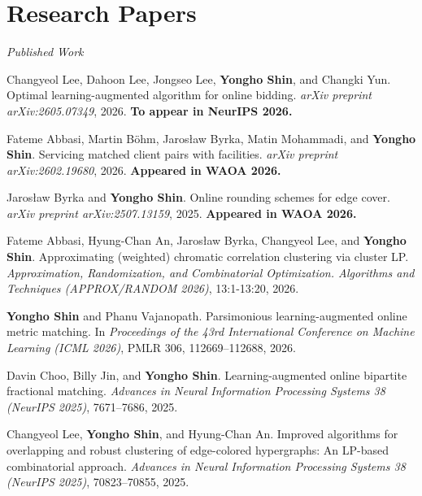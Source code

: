 \documentclass{article}
\begin{document}
\section{Research Papers}
\begin{enumerate}[label={[\arabic*]}]
	\item[]\hspace{-2.5em}\textsl{Published Work}
	
	\item \label{lee2026bid} Changyeol Lee, Dahoon Lee, Jongseo Lee, \textbf{Yongho Shin}, and Changki Yun. Optimal learning-augmented algorithm for online bidding. \emph{arXiv preprint arXiv:2605.07349}, 2026. \textbf{To appear in NeurIPS 2026.}
	
	\item \label{abbasi2026flm} Fateme Abbasi, Martin Böhm, Jarosław Byrka, Matin Mohammadi, and \textbf{Yongho Shin}. Servicing matched client pairs with facilities. \emph{arXiv preprint arXiv:2602.19680}, 2026. \textbf{Appeared in WAOA 2026.}
	
	\item \label{byrka2025setcover}  Jaros{\l}aw Byrka and \textbf{Yongho Shin}. Online rounding schemes for edge cover. 
	\emph{arXiv preprint arXiv:2507.13159}, 2025. 
	\textbf{Appeared in WAOA 2026.}
	
	\item \label{abbasi2025ccc} Fateme Abbasi, Hyung-Chan An, Jaros{\l}aw Byrka, Changyeol Lee, and \textbf{Yongho Shin}. Approximating (weighted) chromatic correlation clustering via cluster LP. \emph{Approximation, Randomization, and Combinatorial Optimization. Algorithms and Techniques (APPROX/RANDOM 2026)}, 13:1-13:20, 2026.

	\item \label{shin2026omm} \textbf{Yongho Shin} and Phanu Vajanopath. Parsimonious learning-augmented online metric matching. In \emph{Proceedings of the 43rd International Conference on Machine Learning (ICML 2026)}, PMLR 306, 112669--112688, 2026.
	
	\item \label{choo2025matching} Davin Choo, Billy Jin, and \textbf{Yongho Shin}. Learning-augmented online bipartite fractional matching. \emph{Advances in Neural Information Processing Systems 38 (NeurIPS 2025)}, 7671--7686, 2025.

	\item \label{lee2025ecc} Changyeol Lee, \textbf{Yongho Shin}, and Hyung-Chan An. Improved algorithms for overlapping and robust clustering of edge-colored hypergraphs: An LP-based combinatorial approach. \emph{Advances in Neural Information Processing Systems 38 (NeurIPS 2025)}, 70823--70855, 2025.


\end{enumerate}
\end{document}
